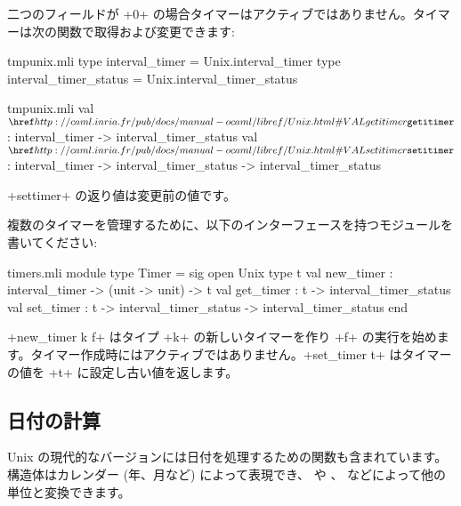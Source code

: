 %
二つのフィールドが \ml+0+ の場合タイマーはアクティブではありません。タイマーは次の関数で取得および変更できます:
%
\begin{codefile}{tmpunix.mli}
type interval_timer = Unix.interval_timer
type interval_timer_status = Unix.interval_timer_status
\end{codefile}
%
\begin{listingcodefile}{tmpunix.mli}
val $\indexlibvalue{Unix}{getitimer}$ : interval_timer -> interval_timer_status
val $\indexlibvalue{Unix}{setitimer}$ :
    interval_timer -> interval_timer_status -> interval_timer_status
\end{listingcodefile}
%
\ml+settimer+ の返り値は変更前の値です。

\begin{exercise}[noanswer]
複数のタイマーを管理するために、以下のインターフェースを持つモジュールを書いてください:
%
\begin{listingcodefile}{timers.mli}
module type Timer = sig
  open Unix
  type t
  val new_timer : interval_timer -> (unit -> unit) -> t
  val get_timer : t -> interval_timer_status
  val set_timer : t -> interval_timer_status -> interval_timer_status
end
\end{listingcodefile}
%
\ml+new_timer k f+ はタイプ \ml+k+ の新しいタイマーを作り \ml+f+ の実行を始めます。タイマー作成時にはアクティブではありません。\ml+set_timer t+ はタイマーの値を \ml+t+ に設定し古い値を返します。

\end{exercise}

\subsection*{日付の計算}

Unix の現代的なバージョンには日付を処理するための関数も含まれています。 構造体はカレンダー (年、月など) によって表現でき、 や 、  などによって他の単位と変換できます。

